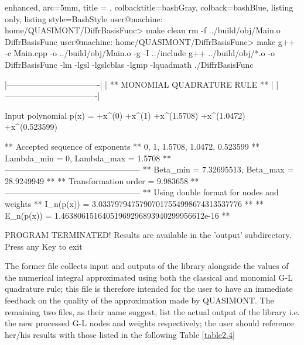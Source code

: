 \documentclass[a4paper, twosided]{book}
\begin{document}
\newpage
\begin{tcblisting}{enhanced,
                   arc=5mm,
                   title = \color{black}{\large \ttfamily Building and executing a custom application},
                   colbacktitle=bashGray,
                   colback=bashBlue,
                   listing only,
                   listing style=BashStyle}
user@machine: home/QUASIMONT/DiffrBasisFunc> make clean
rm -f ../build/obj/Main.o DiffrBasisFunc
user@machine: home/QUASIMONT/DiffrBasisFunc> make
g++ -c Main.cpp -o ../build/obj/Main.o -g  -I ../include
g++ ../build/obj/*.o -o DiffrBasisFunc -lm -lgsl -lgslcblas -lgmp -lquadmath
./DiffrBasisFunc

    |----------------------------------|
    |  ** MONOMIAL QUADRATURE RULE **  |
    |----------------------------------|


 Input polynomial p(x) = +x^(0) +x^(1) +x^(1.5708) +x^(1.0472) +x^(0.523599) 

 ** Accepted sequence of exponents ** 
    {0, 1, 1.5708, 1.0472, 0.523599}
 ** Lambda_min = 0, Lambda_max = 1.5708 **
 --------------------------------------------------
 ** Beta_min = 7.32695513, Beta_max = 28.9249949 **
 ** Transformation order = 9.983658 **
 --------------------------------------------------
 ** Using double format for nodes and weights
 ** I_n(p(x)) = 3.03379794757907017554998674313537776 **
 ** E_n(p(x)) = 1.46380615164051969296893940299956612e-16 **


PROGRAM TERMINATED! Results are available in the 'output' subdirectory.
Press any Key to exit
\end{tcblisting}

\noindent
The former file collects input and outputs of the library alongside the values of the numerical integral approximated using both the classical and monomial G-L quadrature rule; this file is therefore intended for the user to have an immediate feedback on the quality of the approximation made by QUASIMONT. The remaining two files, as their name suggest, list the actual output of the library i.e. the new processed G-L nodes and weights respectively; the user should reference her/his results with those listed in the following Table \ref{table2.4}
\end{document}
